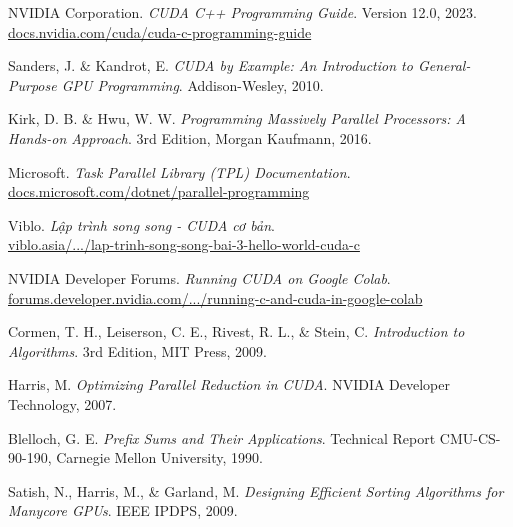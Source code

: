 \documentclass[12pt,a4paper]{report}
\begin{document}
\begin{enumerate}[label={[\arabic*]}]
    \item NVIDIA Corporation. \textit{CUDA C++ Programming Guide}. Version 12.0, 2023. \\
          \href{https://docs.nvidia.com/cuda/cuda-c-programming-guide/}{docs.nvidia.com/cuda/cuda-c-programming-guide}
    
    \item Sanders, J. \& Kandrot, E. \textit{CUDA by Example: An Introduction to General-Purpose GPU Programming}. Addison-Wesley, 2010.
    
    \item Kirk, D. B. \& Hwu, W. W. \textit{Programming Massively Parallel Processors: A Hands-on Approach}. 3rd Edition, Morgan Kaufmann, 2016.
    
    \item Microsoft. \textit{Task Parallel Library (TPL) Documentation}. \\
            \href{https://docs.microsoft.com/en-us/dotnet/standard/parallel-programming/}{docs.microsoft.com/dotnet/parallel-programming}
    
    \item Viblo. \textit{Lập trình song song - CUDA cơ bản}. \\
            \href{https://viblo.asia/p/lap-trinh-song-song-bai-3-hello-world-cuda-c-0gdJzxbkVz5}{viblo.asia/.../lap-trinh-song-song-bai-3-hello-world-cuda-c}
    
    \item NVIDIA Developer Forums. \textit{Running CUDA on Google Colab}. \\
            \href{https://forums.developer.nvidia.com/t/running-c-and-cuda-in-google-colab/237108}{forums.developer.nvidia.com/.../running-c-and-cuda-in-google-colab}
    
    \item Cormen, T. H., Leiserson, C. E., Rivest, R. L., \& Stein, C. \textit{Introduction to Algorithms}. 3rd Edition, MIT Press, 2009.
    
    \item Harris, M. \textit{Optimizing Parallel Reduction in CUDA}. NVIDIA Developer Technology, 2007.
    
    \item Blelloch, G. E. \textit{Prefix Sums and Their Applications}. Technical Report CMU-CS-90-190, Carnegie Mellon University, 1990.
    
    \item Satish, N., Harris, M., \& Garland, M. \textit{Designing Efficient Sorting Algorithms for Manycore GPUs}. IEEE IPDPS, 2009.
\end{enumerate}


\end{document}
